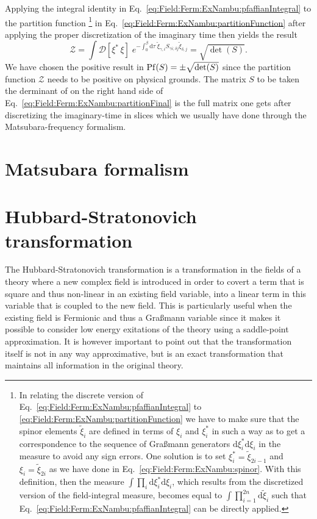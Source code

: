Applying the integral identity in Eq.~\eqref{eq:Field:Ferm:ExNambu:pfaffianIntegral} to the partition function%
%
\footnote{In relating the discrete version of
Eq.~\eqref{eq:Field:Ferm:ExNambu:pfaffianIntegral} to \eqref{eq:Field:Ferm:ExNambu:partitionFunction} we have to make sure that the spinor elements $\tilde{\xi}_i$
are defined in terms of $\xi_i$ and $\xi_i^\ast$ in such a way as to get a correspondence to the sequence of Gra\ss mann
generators $\mathrm{d}\xi^\ast_i\mathrm{d}\xi_i$ in the measure to avoid any sign errors. One solution
is to set $\xi_i^\ast = \tilde{\xi}_{2i-1}$ and $\xi_i = \tilde{\xi}_{2i}$ as we have done in Eq.~\eqref{eq:Field:Ferm:ExNambu:spinor}. With this definition,
then the measure $\int\prod_i\mathrm{d}\xi_i^\ast\mathrm{d}\xi_i$, which results from the discretized version of the field-integral measure, becomes
equal to $\int\prod_{i=1}^{2n}\mathrm{d}\tilde{\xi}_i$ such that Eq.~\eqref{eq:Field:Ferm:ExNambu:pfaffianIntegral} can be directly applied.%
} %
%
in Eq.~\eqref{eq:Field:Ferm:ExNambu:partitionFunction}
after applying the proper discretization of the imaginary time then yields the result
\begin{equation}
    \label{eq:Field:Ferm:ExNambu:partitionFinal}
    \mathcal{Z} = \int\!\mathcal{D}[\xi^\ast\,\xi]\;e^{-\int_0^\beta\!\mathrm{d}\tau\;\tilde{\xi}_{\gamma,i}S_{\gamma i; \delta j}\tilde{\xi}_{\delta, j}} = \sqrt{\det(S)}.
\end{equation}
We have chosen the positive result in $\operatorname{Pf}(S) = \pm\sqrt{\det(S)}$ since the partition function $\mathcal{Z}$ needs to be positive on physical grounds.
The matrix $S$ to be taken the derminant of on the right hand side of Eq.~\eqref{eq:Field:Ferm:ExNambu:partitionFinal} is the full matrix one gets after
discretizing the imaginary-time in slices which we usually have done through the Matsubara-frequency formalism.

\section{Matsubara formalism}



\section{Hubbard-Stratonovich transformation}

The Hubbard-Stratonovich transformation is a transformation in the fields of a theory where a new complex field is introduced
in order to covert a term that is square and thus non-linear in an existing field variable, into a linear term in this
variable that is coupled to the new field. This is particularly useful when the existing field is Fermionic and thus
a Gra\ss mann variable since it makes it possible to consider low energy exitations of the theory using \eg a saddle-point
approximation. It is however important to point out that the transformation itself is not in any way approximative, but is
an exact transformation that maintains all information in the original theory.

